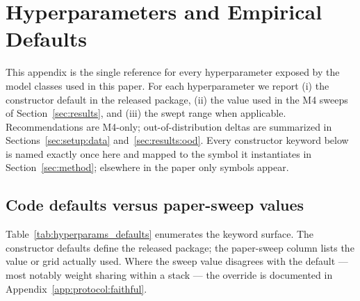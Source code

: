%
%
%

\section{Hyperparameters and Empirical Defaults}
\label{app:hyperparams}

This appendix is the single reference for every hyperparameter exposed by
the model classes used in this paper. For each hyperparameter we report
(i) the constructor default in the released package, (ii) the value used in
the M4 sweeps of Section~\ref{sec:results}, and (iii) the swept range when
applicable. Recommendations are M4-only; out-of-distribution deltas are
summarized in Sections~\ref{sec:setup:data} and~\ref{sec:results:ood}.
Every constructor keyword below is named exactly once here and mapped to
the symbol it instantiates in Section~\ref{sec:method}; elsewhere in the
paper only symbols appear.

\subsection{Code defaults versus paper-sweep values}
\label{app:hyperparams:defaults}

Table~\ref{tab:hyperparams_defaults} enumerates the keyword surface. The
constructor defaults define the released package; the paper-sweep column
lists the value or grid actually used. Where the sweep value disagrees with
the default --- most notably weight sharing within a stack --- the override
is documented in Appendix~\ref{app:protocol:faithful}.

